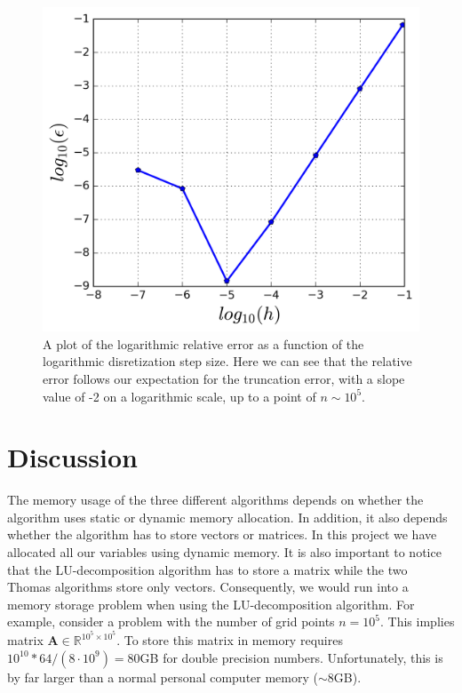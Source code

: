 \documentclass[a4paper]{article}
\begin{document}
\begin{figure}[H]
  \centering
  \includegraphics[width=\columnwidth]{precision_general.png}
  \caption{\label{fig:prec} A plot of the logarithmic relative error as a function of the logarithmic disretization step size. Here we can see that the relative error follows our expectation for the truncation error, with a slope value of -2 on a logarithmic scale, up to a point of $n\sim 10^5$.}
  \label{fig3}
\end{figure}

\section{Discussion}
The memory usage of the three different algorithms depends on whether the algorithm uses static or dynamic memory allocation. In addition, it also depends whether the algorithm has to store vectors or matrices. In this project we have allocated all our variables using dynamic memory. It is also important to notice that the LU-decomposition algorithm has to store a matrix while the two Thomas algorithms store only vectors. Consequently, we would run into a memory storage problem when using the LU-decomposition algorithm. For example, consider a problem with the number of grid points $n=10^5$. This implies matrix $\mathbf{A}\in\mathbb{R}^{10
^5\times 10^5}$. To store this matrix in memory requires $10^{10}*64/(8\cdot 10^9)=80$GB for double precision numbers. Unfortunately, this is by far larger than a normal personal computer memory ($\sim 8$GB). 
\end{document}
